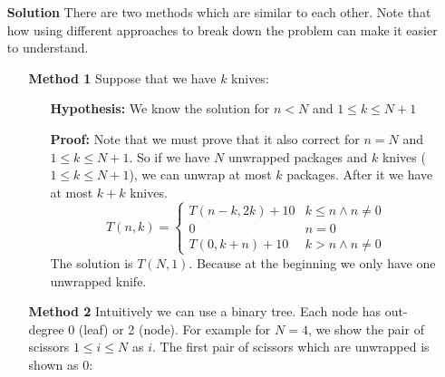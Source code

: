 \documentclass{book}
\begin{document}
	\begin{itemize}
		\item[\textbf{Solution}] There are two methods which are similar to each other. Note that how using different approaches to break down the problem can make it easier to understand.
		\begin{itemize}
			\item[\textbf{Method 1}] Suppose that we have $k$ knives:
			\begin{itemize}
				\item[\textbf{Hypothesis:}] We know the solution for $n < N$ and $1 \le k \le N + 1$
				\item[\textbf{Proof:}] Note that we must prove that it also correct for $n = N$ and $1 \le k \le N + 1$. So if we have $N$ unwrapped packages and $k$ knives ($1 \le k \le N + 1$), we can unwrap at most $k$ packages. After it we have at most $k + k$ knives.
				\begin{equation*}
					T(n, k) = \begin{cases}
						T(n - k, 2k) + 10 & k \le n \land n \ne 0 \\
						0 & n = 0 \\
						T(0, k + n) + 10 & k > n \land n \ne 0
					\end{cases}
				\end{equation*}
                The solution is $T(N, 1)$. Because at the beginning we only have one unwrapped knife.
			\end{itemize}
			\item[\textbf{Method 2}] Intuitively we can use a binary tree. Each node has out-degree 0 (leaf) or 2 (node). For example for $N = 4$, we show the pair of scissors $1\le i \le N$ as $i$. The first pair of scissors which are unwrapped is shown as $0$:
			

\end{itemize}
\end{itemize}
\end{document}
